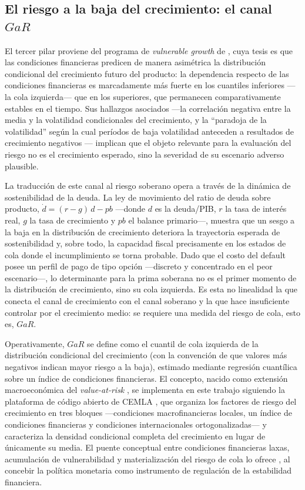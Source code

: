 \subsection{El riesgo a la baja del crecimiento: el canal \texorpdfstring{$GaR$}{GaR}}

El tercer pilar proviene del programa de \textit{vulnerable growth} de \citet{ABG2019b}, cuya tesis es que las condiciones financieras predicen de manera asimétrica la distribución condicional del crecimiento futuro del producto: la dependencia respecto de las condiciones financieras es marcadamente más fuerte en los cuantiles inferiores —la cola izquierda— que en los superiores, que permanecen comparativamente estables en el tiempo. Sus hallazgos asociados —la correlación negativa entre la media y la volatilidad condicionales del crecimiento, y la ``paradoja de la volatilidad'' según la cual períodos de baja volatilidad anteceden a resultados de crecimiento negativos \citep{BrunnermeierSannikov2014,AdrianBoyarchenko2012}— implican que el objeto relevante para la evaluación del riesgo no es el crecimiento esperado, sino la severidad de su escenario adverso plausible.

La traducción de este canal al riesgo soberano opera a través de la dinámica de sostenibilidad de la deuda. La ley de movimiento del ratio de deuda sobre producto, $\dot{d} = (r - g)\,d - pb$ —donde $d$ es la deuda/PIB, $r$ la tasa de interés real, $g$ la tasa de crecimiento y $pb$ el balance primario—, muestra que un sesgo a la baja en la distribución de crecimiento deteriora la trayectoria esperada de sostenibilidad y, sobre todo, la capacidad fiscal precisamente en los estados de cola donde el incumplimiento se torna probable. Dado que el costo del default posee un perfil de pago de tipo opción —discreto y concentrado en el peor escenario—, lo determinante para la prima soberana no es el primer momento de la distribución de crecimiento, sino su cola izquierda. Es esta no linealidad la que conecta el canal de crecimiento con el canal soberano y la que hace insuficiente controlar por el crecimiento medio: se requiere una medida del riesgo de cola, esto es, $GaR$.

Operativamente, $GaR$ se define como el cuantil de cola izquierda de la distribución condicional del crecimiento (con la convención de que valores más negativos indican mayor riesgo a la baja), estimado mediante regresión cuantílica \citep{KoenkerBassett1978,Koenker2004} sobre un índice de condiciones financieras. El concepto, nacido como extensión macroeconómica del \textit{value-at-risk} \citep{PrasadEtAl2019}, se implementa en este trabajo siguiendo la plataforma de código abierto de CEMLA \citep{OssandonBusch2022}, que organiza los factores de riesgo del crecimiento en tres bloques —condiciones macrofinancieras locales, un índice de condiciones financieras y condiciones internacionales ortogonalizadas— y caracteriza la densidad condicional completa del crecimiento en lugar de únicamente su media. El puente conceptual entre condiciones financieras laxas, acumulación de vulnerabilidad y materialización del riesgo de cola lo ofrece \citet{Stein2012}, al concebir la política monetaria como instrumento de regulación de la estabilidad financiera.


